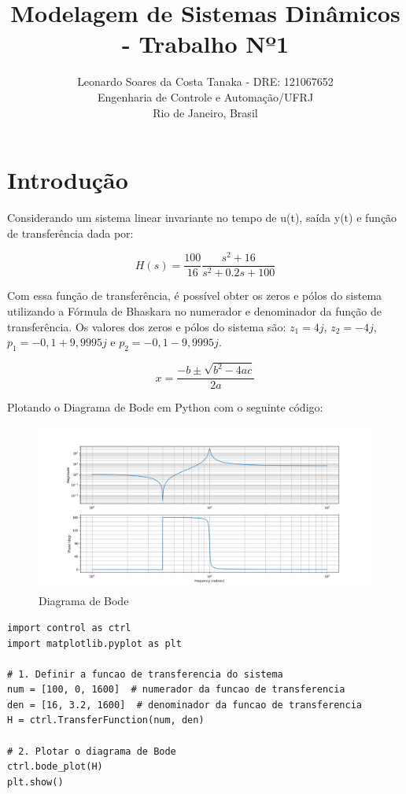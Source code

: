 \documentclass[10pt]{article}
\title{Modelagem de Sistemas Dinâmicos - Trabalho Nº1}
\author{
    Leonardo Soares da Costa Tanaka - DRE: 121067652 \\
    Engenharia de Controle e Automação/UFRJ \\
    Rio de Janeiro, Brasil
}
\date{}
\begin{document}
\maketitle
\thispagestyle{capa}

\section{Introdução}

\quad Considerando um sistema linear invariante no tempo de u(t), saída y(t) e 
função de transferência dada por:

\begin{equation}
    H(s) = \frac{100}{16} \frac{s^2 + 16}{s^2 + 0.2s + 100}
\end{equation}

\quad Com essa função de transferência, é possível obter os zeros e pólos do sistema utilizando a Fórmula de Bhaskara no numerador e denominador da função de transferência.
Os valores dos zeros e pólos do sistema são:
$z_1 = 4j$, $z_2 = -4j$, $p_1 = -0,1 + 9,9995j$ e $p_2 = -0,1 - 9,9995j$.

\begin{equation}
    x = \frac{-b \pm \sqrt{b^2 - 4ac}}{2a}
\end{equation}

\quad Plotando o Diagrama de Bode em Python com o seguinte código:

\begin{figure}[h]
    \centering
    \includegraphics[scale=0.4]{bode.png}
    \caption{Diagrama de Bode}
\end{figure}

\begin{lstlisting}
import control as ctrl
import matplotlib.pyplot as plt
    
# 1. Definir a funcao de transferencia do sistema
num = [100, 0, 1600]  # numerador da funcao de transferencia
den = [16, 3.2, 1600]  # denominador da funcao de transferencia
H = ctrl.TransferFunction(num, den)
    
# 2. Plotar o diagrama de Bode
ctrl.bode_plot(H)
plt.show()    
\end{lstlisting}
\end{document}
